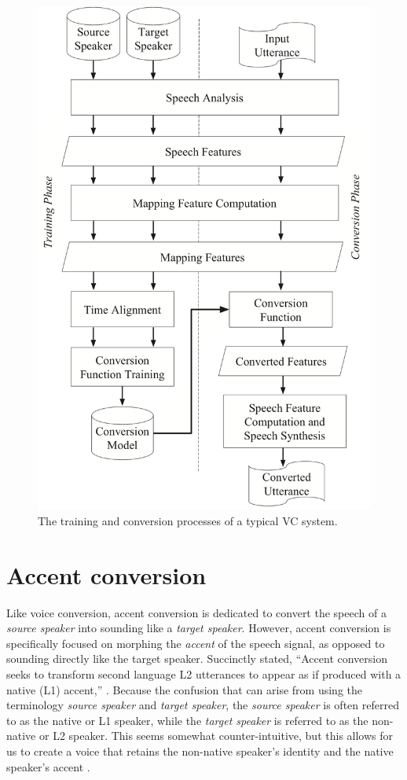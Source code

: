 \documentclass
[
    a4paper,
    twoside,
    12pt,
]
{report}
\begin{document}
\begin{figure}[H]
\centering
\includegraphics[scale=0.25]{img/vc-flowchart.png}
\caption{The training and conversion processes of a typical VC system.}
\label{fig:vc-flowchart}
\end{figure}

\hypertarget{accent-conversion}{%
\section{Accent conversion}\label{accent-conversion}}

Like voice conversion, accent conversion is dedicated to convert the
speech of a \emph{source speaker} into sounding like a \emph{target
speaker}. However, accent conversion is specifically focused on morphing
the \emph{accent} of the speech signal, as opposed to sounding directly
like the target speaker. Succinctly stated, ``Accent conversion seeks to
transform second language L2 utterances to appear as if produced with a
native (L1) accent,'' \parencite{aryal2014a}. Because the confusion that
can arise from using the terminology \emph{source speaker} and
\emph{target speaker}, the \emph{source speaker} is often referred to as
the native or L1 speaker, while the \emph{target speaker} is referred to
as the non-native or L2 speaker. This seems somewhat counter-intuitive,
but this allows for us to create a voice that retains the non-native
speaker's identity and the native speaker's accent
\parencite{zhao2018a}.
\end{document}

